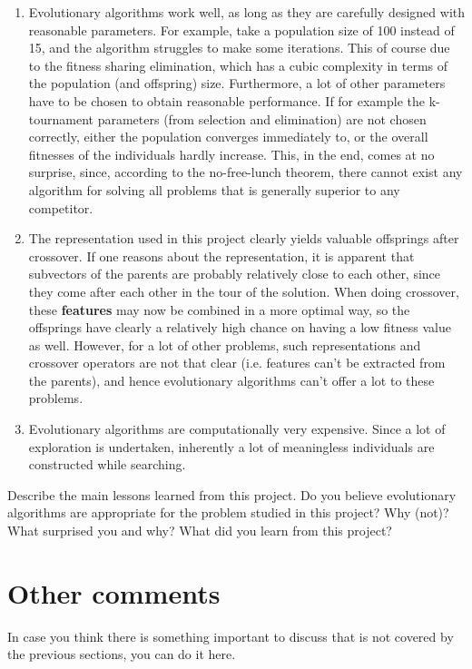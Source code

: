 \documentclass[a4paper,10pt]{article}
\newcommand{\ReplaceMe}[1]{{\color{blue}#1}}
\begin{document}
\begin{enumerate}
 \item Evolutionary algorithms work well, as long as they are carefully designed with reasonable parameters. For example, take a population size of 100 instead of 15, and the algorithm struggles to make some iterations. This of course due to the fitness sharing elimination, which has a cubic complexity in terms of the population (and offspring) size. Furthermore, a lot of other parameters have to be chosen to obtain reasonable performance. If for example the k-tournament parameters (from selection and elimination) are not chosen correctly, either the population converges immediately to, or the overall fitnesses of the individuals hardly increase. This, in the end, comes at no surprise, since, according to the no-free-lunch theorem, there cannot exist any algorithm for solving all problems that is generally superior to any competitor.
 \item The representation used in this project clearly yields valuable offsprings after crossover. If one reasons about the representation, it is apparent that subvectors of the parents are probably relatively close to each other, since they come after each other in the tour of the solution. When doing crossover, these \textbf{features} may now be combined in a more optimal way, so the offsprings have clearly a relatively high chance on having a low fitness value as well. However, for a lot of other problems, such representations and crossover operators are not that clear (i.e. features can't be extracted from the parents), and hence evolutionary algorithms can't offer a lot to these problems. 
 \item Evolutionary algorithms are computationally very expensive. Since a lot of exploration is undertaken, inherently a lot of meaningless individuals are constructed while searching.
\end{enumerate}

\ReplaceMe{Describe the main lessons learned from this project. Do you believe evolutionary algorithms are appropriate for the problem studied in this project? Why (not)? What surprised you and why? What did you learn from this project?}


\section{Other comments} \label{sec_other}

\ReplaceMe{In case you think there is something important to discuss that is not covered by the previous sections, you can do it here. }

 

\end{document}
